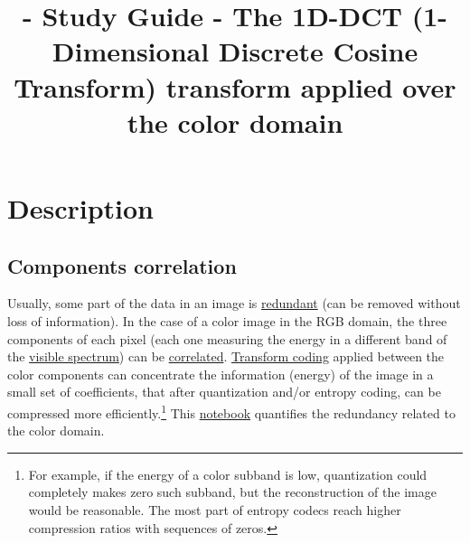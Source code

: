 

\title{\SM{} - Study Guide - The 1D-DCT (1-Dimensional Discrete Cosine Transform) transform applied over the color domain}

\maketitle

\tableofcontents

\section{Description}

\subsection{Components correlation}

Usually, some part of the data in an image is
\href{https://en.wikipedia.org/wiki/Data_redundancy}{redundant} (can
be removed without loss of information). In the case of a color image
in the RGB domain, the three components of each pixel (each one
measuring the energy in a different band of the
\href{https://en.wikipedia.org/wiki/Visible_spectrum}{visible
  spectrum}) can be
\href{https://en.wikipedia.org/wiki/Correlation_and_dependence}{correlated}.
\href{https://vicente-gonzalez-ruiz.github.io/transform_coding/}{Transform
  coding} applied between the color components can concentrate the
information (energy) of the image in a small set of coefficients, that
after quantization and/or entropy coding, can be compressed more
efficiently.\footnote{For example, if the energy of a color subband is
low, quantization could completely makes zero such subband, but the
reconstruction of the image would be reasonable. The most part of
entropy codecs reach higher compression ratios with sequences of
zeros.} This
\href{https://github.com/Sistemas-Multimedia/Sistemas-Multimedia.github.io/blob/master/milestones/06-YUV_compression/color_redundancy.ipynb}{notebook}
quantifies the redundancy related to the color domain.

